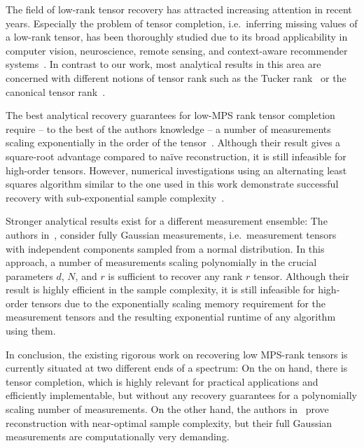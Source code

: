 The field of low-rank tensor recovery has attracted increasing attention in recent years.
Especially the problem of tensor completion, i.e.\ inferring missing values of a low-rank tensor, has been thoroughly studied due to its broad applicability in computer vision, neuroscience, remote sensing, and context-aware recommender systems~\cite{Li_2010_Tensor,Zhu_2016_ContextAware,Wang_2014_LowRank}.
In contrast to our work, most analytical results in this area are concerned with different notions of tensor rank such as the Tucker rank~\cite{Kressner_2013_LowRank,Zhang_2016_Cross} or the canonical tensor rank~\cite{Krishnamurthy_2013_LowRank,Potechin_2017_Exact}.

The best analytical recovery guarantees for low-MPS rank tensor completion require -- to the best of the authors knowledge -- a number of measurements scaling exponentially in the order of the tensor~\cite{Phien_2016_Efficient}.
Although their result gives a square-root advantage compared to na\"ive reconstruction, it is still infeasible for high-order tensors.
However, numerical investigations using an alternating least squares algorithm similar to the one used in this work demonstrate successful recovery with sub-exponential sample complexity~\cite{Grasedyck_2015_Variants,Wang_2016_Tensor}.


Stronger analytical results exist for a different measurement ensemble:
The authors in~\cite{Rauhut_2014_Tensor}, consider fully Gaussian measurements, i.e.\ measurement tensors with independent components sampled from a normal distribution.
In this approach, a number of measurements scaling polynomially in the crucial parameters $d$, $N$, and $r$ is sufficient to recover any rank $r$ tensor.
Although their result is highly efficient in the sample complexity, it is still infeasible for high-order tensors due to the exponentially scaling memory requirement for the measurement tensors and the resulting exponential runtime of any algorithm using them.

In conclusion, the existing rigorous work on recovering low MPS-rank tensors is currently situated at two different ends of a spectrum:
On the on hand, there is tensor completion, which is highly relevant for practical applications and efficiently implementable, but without any recovery guarantees for a polynomially scaling number of measurements.
On the other hand, the authors in~\cite{Rauhut_2014_Tensor} prove reconstruction with near-optimal sample complexity, but their full Gaussian measurements are computationally very demanding.

